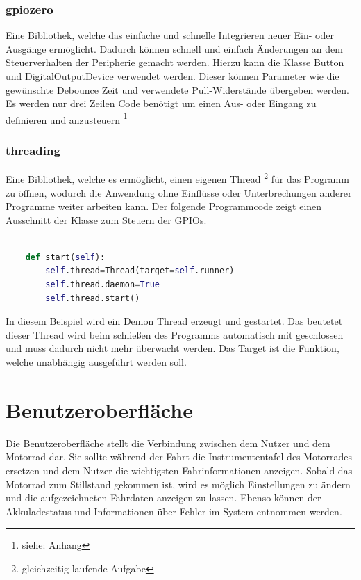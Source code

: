 \subsubsection{gpiozero}

Eine Bibliothek, welche das einfache und schnelle Integrieren neuer Ein- oder Ausgänge ermöglicht. Dadurch können schnell und einfach Änderungen an dem Steuerverhalten der Peripherie gemacht werden. Hierzu kann die Klasse Button und DigitalOutputDevice verwendet werden. Dieser können Parameter wie die gewünschte Debounce Zeit und verwendete Pull-Widerstände übergeben werden. Es werden nur drei Zeilen Code benötigt um einen Aus- oder Eingang zu definieren und anzusteuern \footnote{siehe: Anhang}

\subsubsection{threading} \label{sec:thread}

Eine Bibliothek, welche es ermöglicht, einen eigenen Thread \footnote{gleichzeitig laufende Aufgabe} für das Programm zu öffnen, wodurch die Anwendung ohne Einflüsse oder Unterbrechungen anderer Programme weiter arbeiten kann. Der folgende Programmcode zeigt einen Ausschnitt der Klasse zum Steuern der GPIOs. 

\begin{lstlisting}[language=Python, caption={Code zum Starten eines Threads},captionpos=b]
	
	def start(self):
		self.thread=Thread(target=self.runner)
		self.thread.daemon=True
		self.thread.start()

\end{lstlisting}

In diesem Beispiel wird ein Demon Thread erzeugt und gestartet. Das beutetet dieser Thread wird beim schließen des Programms automatisch mit geschlossen und muss dadurch nicht mehr überwacht werden. Das Target ist die Funktion, welche unabhängig ausgeführt werden soll.

\newpage


\section{Benutzeroberfläche}
Die Benutzeroberfläche stellt die Verbindung zwischen dem Nutzer und dem Motorrad dar. Sie sollte während der Fahrt die Instrumententafel des Motorrades ersetzen und dem Nutzer die wichtigsten Fahrinformationen anzeigen. Sobald das Motorrad zum Stillstand gekommen ist, wird es möglich Einstellungen zu ändern und die aufgezeichneten Fahrdaten anzeigen zu lassen. Ebenso können der Akkuladestatus und Informationen über Fehler im System entnommen werden.

